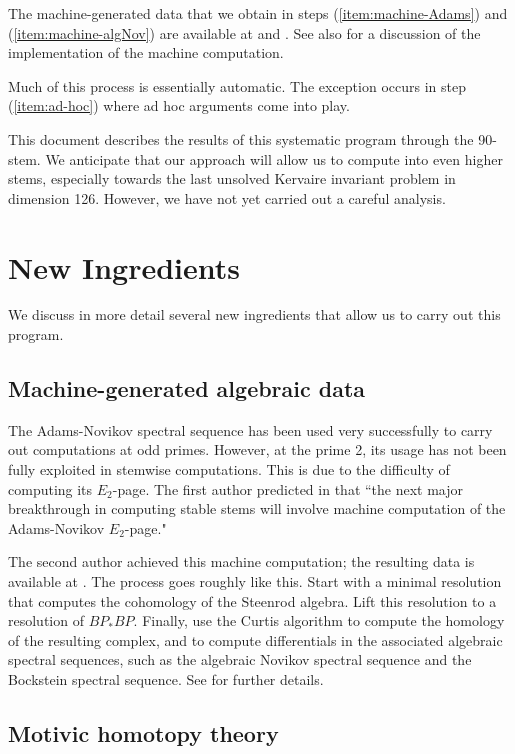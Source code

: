 The machine-generated data that we obtain in steps (\ref{item:machine-Adams}) and (\ref{item:machine-algNov}) are available at 
\cite{Isaksen14a} and \cite{IWX19}.
See also \cite{Wang20} for a discussion of the implementation of the
machine computation.

Much of this process is essentially automatic.
The exception occurs in step (\ref{item:ad-hoc}) where ad hoc arguments come
into play.

This document describes the results of this systematic program through the
90-stem.  We anticipate that our approach will allow us to compute into 
even higher stems, especially towards the last unsolved Kervaire invariant problem in dimension 126.  However, we have not yet carried out a careful analysis.

\section{New Ingredients}

We discuss in more detail several new ingredients that allow us to carry out this program.

\subsection{Machine-generated algebraic data} 


The Adams-Novikov spectral sequence has been used very successfully
to carry out computations at odd primes.  However, at the prime 2, its usage has not been fully exploited in stemwise computations. This is due to the difficulty of computing its $E_2$-page. The first author predicted in
\cite{Isaksen14c} that ``the next major breakthrough in computing stable stems will involve machine computation of the Adams-Novikov $E_2$-page."

The second author achieved this machine computation; the resulting data is available at \cite{IWX19}.  The process goes roughly like this.
Start with a minimal resolution that computes the cohomology of the  Steenrod algebra.  Lift this resolution to a resolution of $BP_*BP$.
Finally, use the Curtis algorithm to compute the homology of the resulting
complex, and to compute differentials in the associated algebraic
spectral sequences, such as 
the algebraic Novikov spectral sequence 
and the Bockstein spectral sequence.
See \cite{Wang20} for further details.

\subsection{Motivic homotopy theory}


